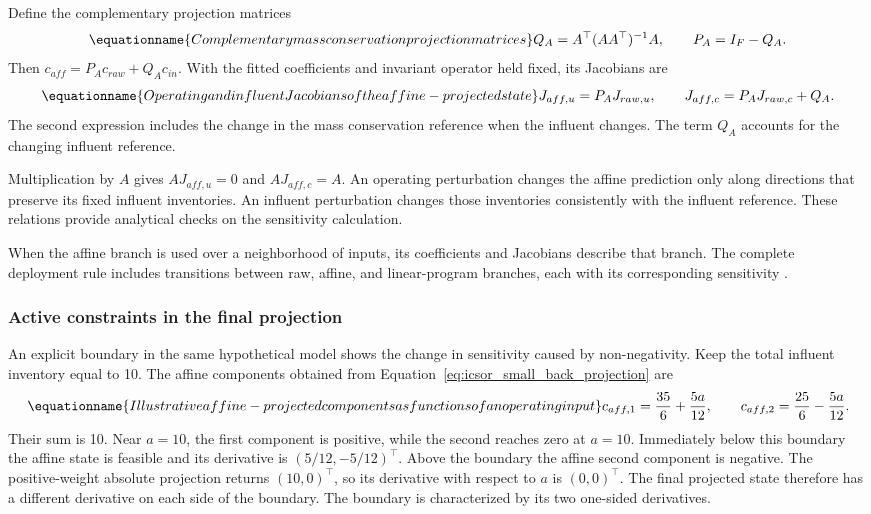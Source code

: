 Define the complementary projection matrices
\begin{equation}
\equationname{Complementary mass conservation projection matrices}
\label{eq:icsor_projection_matrices}
Q_A=A^\top(AA^\top)^{-1}A,
\qquad P_A=I_F-Q_A.
\end{equation}
Then \(c_{aff}=P_Ac_{raw}+Q_Ac_{in}\). With the fitted coefficients and invariant operator held fixed, its Jacobians are
\begin{equation}
\equationname{Operating and influent Jacobians of the affine-projected state}
\label{eq:icsor_affine_jacobians}
J_{aff,u}=P_AJ_{raw,u},
\qquad J_{aff,c}=P_AJ_{raw,c}+Q_A.
\end{equation}
The second expression includes the change in the mass conservation reference when the influent changes. The term \(Q_A\) accounts for the changing influent reference.

Multiplication by \(A\) gives \(AJ_{aff,u}=0\) and \(AJ_{aff,c}=A\). An operating perturbation changes the affine prediction only along directions that preserve its fixed influent inventories. An influent perturbation changes those inventories consistently with the influent reference. These relations provide analytical checks on the sensitivity calculation.

When the affine branch is used over a neighborhood of inputs, its coefficients and Jacobians describe that branch. The complete deployment rule includes transitions between raw, affine, and linear-program branches, each with its corresponding sensitivity \citep{Selerio2026}.

\subsubsection{Active constraints in the final projection}

An explicit boundary in the same hypothetical model shows the change in sensitivity caused by non-negativity. Keep the total influent inventory equal to 10. The affine components obtained from Equation~\eqref{eq:icsor_small_back_projection} are
\begin{equation}
\equationname{Illustrative affine-projected components as functions of an operating input}
\label{eq:icsor_small_affine_branch}
c_{aff,1}=\frac{35}{6}+\frac{5a}{12},
\qquad
c_{aff,2}=\frac{25}{6}-\frac{5a}{12}.
\end{equation}
Their sum is 10. Near \(a=10\), the first component is positive, while the second reaches zero at \(a=10\). Immediately below this boundary the affine state is feasible and its derivative is \((5/12,-5/12)^\top\). Above the boundary the affine second component is negative. The positive-weight absolute projection returns \((10,0)^\top\), so its derivative with respect to \(a\) is \((0,0)^\top\). The final projected state therefore has a different derivative on each side of the boundary. The boundary is characterized by its two one-sided derivatives.

